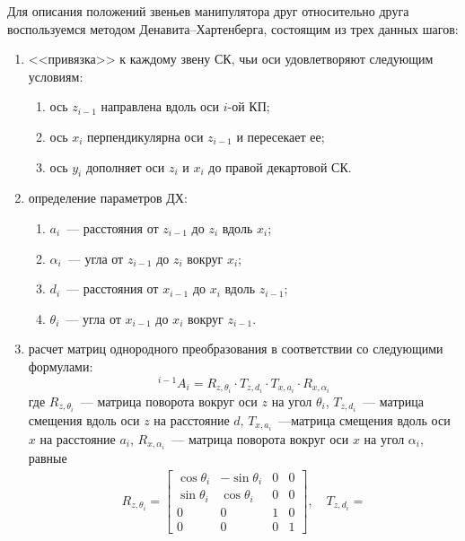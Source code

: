 Для описания положений звеньев манипулятора друг относительно друга воспользуемся методом Денавита--Хартенберга, состоящим из трех данных шагов:
\begin{enumerate}
    \item <<привязка>> к каждому звену СК, чьи оси удовлетворяют следующим условиям:
    \begin{enumerate}
	    \item ось $z_{i-1}$ направлена вдоль оси $i$-ой КП;
        \item ось $x_i$ перпендикулярна оси $z_{i-1}$ и пересекает ее;
        \item ось $y_i$ дополняет оси $z_i$ и $x_i$ до правой декартовой СК.
    \end{enumerate}
    \item определение параметров ДХ:
    \begin{enumerate}
	    \item $a_i$~--- расстояния от $z_{i-1}$ до $z_i$ вдоль $x_i$;
	    \item $\alpha_i$~--- угла от $z_{i-1}$ до $z_i$ вокруг $x_i$;
        \item $d_i$~--- расстояния от $x_{i-1}$ до $x_i$ вдоль $z_{i-1}$;
        \item $\theta_i$~--- угла от $x_{i-1}$ до $x_i$ вокруг $z_{i-1}$.
    \end{enumerate}
    \item расчет матриц однородного преобразования в соответствии со следующими формулами:
    \begin{equation}\label{DH_matrix}
        {}^{i-1}A_{i} = R_{z, \theta_i} \cdot T_{z, d_i} \cdot T_{x, a_i} \cdot R_{x, \alpha_i}
    \end{equation}
    где $R_{z, \theta_i}$~--- матрица поворота вокруг оси $z$ на угол $\theta_i$, $T_{z, d_i}$~--- матрица смещения вдоль оси $z$ на расстояние $d$, $T_{x, a_i}$~---матрица смещения вдоль оси $x$ на расстояние $a_i$,  $R_{x, \alpha_i}$~--- матрица поворота вокруг оси $x$ на угол $\alpha_i$, равные
    \begin{gather}
        R_{z, \theta_i} =
        \begin{bmatrix}
            \cos\theta_i & -\sin\theta_i & 0 & 0\\
            \sin\theta_i &  \cos\theta_i & 0 & 0\\
            0 & 0 & 1 & 0\\
            0 & 0 & 0 & 1
        \end{bmatrix}\!\!,
        \quad
        T_{z, d_i} =

\end{gather}
\end{enumerate}
